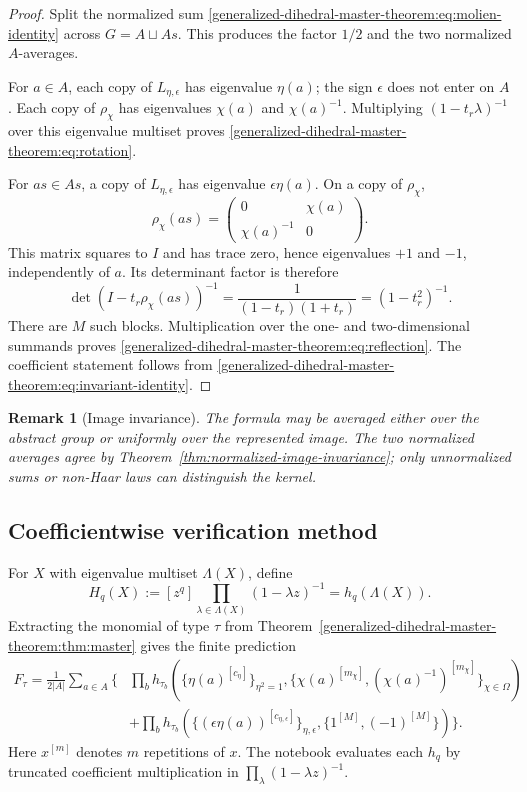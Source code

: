 \documentclass[10pt]{article}
\newtheorem{remark}{Remark}
\begin{document}
\begin{proof}
Split the normalized sum \eqref{generalized-dihedral-master-theorem:eq:molien-identity} across
$G=A\sqcup As$.  This produces the factor $1/2$ and the two normalized
$A$-averages.

For $a\in A$, each copy of $L_{\eta,\epsilon}$ has eigenvalue $\eta(a)$;
the sign $\epsilon$ does not enter on $A$.  Each copy of $\rho_\chi$ has
eigenvalues $\chi(a)$ and $\chi(a)^{-1}$.  Multiplying
$(1-t_r\lambda)^{-1}$ over this eigenvalue multiset proves
\eqref{generalized-dihedral-master-theorem:eq:rotation}.

For $as\in As$, a copy of $L_{\eta,\epsilon}$ has eigenvalue
$\epsilon\eta(a)$.  On a copy of $\rho_\chi$,
\[
  \rho_\chi(as)=
  \begin{pmatrix}
  0&\chi(a)\\
  \chi(a)^{-1}&0
  \end{pmatrix}.
\]
This matrix squares to $I$ and has trace zero, hence eigenvalues $+1$ and
$-1$, independently of $a$.  Its determinant factor is therefore
\[
  \det(I-t_r\rho_\chi(as))^{-1}
  =\frac1{(1-t_r)(1+t_r)}
  =(1-t_r^2)^{-1}.
\]
There are $M$ such blocks.  Multiplication over the one- and two-dimensional
summands proves \eqref{generalized-dihedral-master-theorem:eq:reflection}.  The coefficient statement follows
from \eqref{generalized-dihedral-master-theorem:eq:invariant-identity}.
\end{proof}

\begin{remark}[Image invariance]
The formula may be averaged either over the abstract group or uniformly over
the represented image. The two normalized averages agree by
Theorem~\ref{thm:normalized-image-invariance}; only unnormalized sums or
non-Haar laws can distinguish the kernel.
\end{remark}

\subsection{Coefficientwise verification method}

For $X$ with eigenvalue multiset $\Lambda(X)$, define
\[
  H_q(X):=[z^q]\prod_{\lambda\in\Lambda(X)}(1-\lambda z)^{-1}
  =h_q(\Lambda(X)).
\]
Extracting the monomial of type $\tau$ from Theorem~\ref{generalized-dihedral-master-theorem:thm:master} gives the
finite prediction
\begin{equation}\label{generalized-dihedral-master-theorem:eq:finite-prediction}
\begin{split}
  F_\tau
  =\frac1{2|A|}\sum_{a\in A}
  \bigg\{&
  \prod_b h_{\tau_b}\!\left(
    \{\eta(a)^{[c_\eta]}\}_{\eta^2=1},
    \{\chi(a)^{[m_\chi]},
      (\chi(a)^{-1})^{[m_\chi]}\}_{\chi\in\Omega}
  \right)\\
  &+
  \prod_b h_{\tau_b}\!\left(
    \{(\epsilon\eta(a))^{[c_{\eta,\epsilon}]}\}_{\eta,\epsilon},
    \{1^{[M]},(-1)^{[M]}\}
  \right)
  \bigg\}.
\end{split}
\end{equation}
Here $x^{[m]}$ denotes $m$ repetitions of $x$.  The notebook evaluates each
$h_q$ by truncated coefficient multiplication in
$\prod_\lambda(1-\lambda z)^{-1}$.
\end{document}
